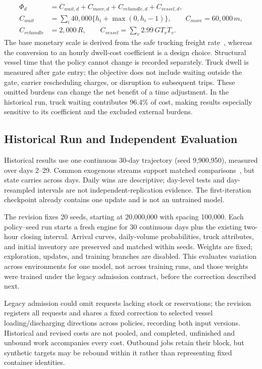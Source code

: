 \documentclass[a4paper]{llncs}
\begin{document}
\begin{equation}
\begin{aligned}
\Phi_d&=C_{wait,d}+C_{move,d}+C_{rehandle,d}+C_{vessel,d},\\
C_{wait}&=\sum_i 40{,}000\{h_i+\max(0,h_i-1)\},\qquad
C_{move}=60{,}000\,m,\\
C_{rehandle}&=2{,}000\,R,\qquad
C_{vessel}=\sum_v 2.99\,GT_v T_v.
\end{aligned}
\end{equation}
The base monetary scale is
derived from the safe trucking freight rate~\cite{ref24}, whereas the
conversion to an hourly dwell-cost coefficient is a design choice.
Structural vessel time that the policy cannot change is recorded
separately. Truck dwell is measured after gate entry; the objective
does not include waiting outside the gate, carrier rescheduling
charges, or disruption to subsequent trips. These omitted burdens
can change the net benefit of a time adjustment. In the historical run,
truck waiting contributes 96.4\% of cost, making results especially
sensitive to its coefficient and the excluded external burdens.

\subsection{Historical Run and Independent Evaluation}
\label{sec:independent-protocol}
Historical results use one continuous 30-day trajectory (seed
9{,}900{,}950), measured over days 2--29. Common exogenous streams
support matched comparisons~\cite{ref22}, but state carries across
days. Daily wins are descriptive; day-level tests and day-resampled
intervals are not independent-replication evidence. The first-iteration
checkpoint already contains one update and is not an untrained model.

The revision fixes 20 seeds, starting at 20{,}000{,}000 with spacing
100{,}000. Each policy--seed run starts a fresh engine for 30 continuous
days plus the existing two-hour closing interval. Arrival curves,
daily-volume probabilities, truck attributes, and initial inventory
are preserved and matched within seeds. Weights are fixed; exploration,
updates, and training branches are disabled. This evaluates variation
across environments for one model, not across training runs, and those
weights were trained under the legacy admission contract, before the
correction described next.

Legacy admission could omit requests lacking stock or reservations; the
revision registers all requests and shares a fixed correction to
selected vessel loading/discharging directions across policies,
recording both input versions. Historical and revised costs are not
pooled, and completed, unfinished and unbound work accompanies every
cost. Outbound jobs retain their block, but synthetic targets may be
rebound within it rather than representing fixed container identities.
\end{document}
